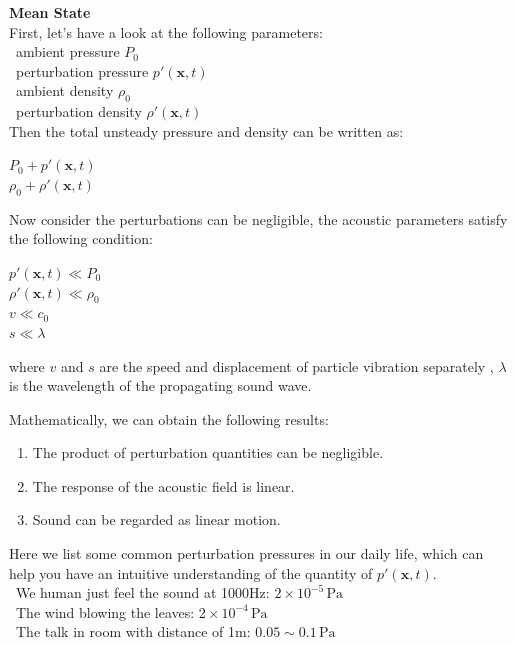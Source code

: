 \documentclass[graybox]{svmult}
\begin{document}
\bigskip

\noindent 
\textbf{Mean State}\\ 
First, let's have a look at the following parameters:\\
 \textbullet\ ambient pressure $P_0$ \\
 \textbullet\ perturbation pressure $p'(\mathbf{x}, t)$\\
 \textbullet\ ambient density $\rho_0$ \\
 \textbullet\ perturbation density $\rho'(\mathbf{x}, t)$\\
Then the total unsteady pressure and density can be written as:
\begin{center}
$P_0 + p'(\mathbf{x}, t)$ \\
$\rho_0 + \rho'(\mathbf{x}, t)$
\end{center}

Now consider the perturbations can be negligible, the acoustic parameters satisfy the following condition:
\begin{center}
$p'(\mathbf{x}, t) \ll P_0$ \\
$\rho'(\mathbf{x}, t) \ll \rho_0$ \\
$v \ll c_0$\\
$s \ll \lambda $\\
\end{center}

where $v$ and $s$ are the speed and displacement of particle vibration separately , $\lambda$ is the wavelength of the propagating sound wave.

Mathematically, we can obtain the following results:
\begin{enumerate}
    \item The product of perturbation quantities can be negligible.
    \item The response of the acoustic field is linear.
    \item Sound can be regarded as linear motion.
\end{enumerate}

Here we list some common perturbation pressures in our daily life, which can help you have an intuitive understanding of the quantity of $p'(\mathbf{x}, t)$.\\
 \textbullet\ We human just feel the sound at 1000Hz: $2 \times 10^{-5} \, \text{Pa}$ \\
\textbullet\ The wind blowing the leaves: $2 \times 10^{-4} \, \text{Pa}$ \\
 \textbullet\ The talk in room with distance of 1m: $0.05 \sim 0.1 \, \text{Pa}$ \\
\end{document}
